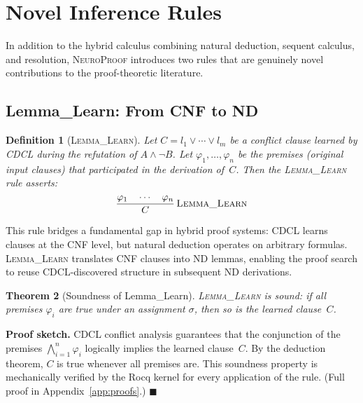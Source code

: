 \documentclass[conference]{IEEEtran}
\newtheorem{theorem}{Theorem}[section]
\newtheorem{definition}[theorem]{Definition}
\newenvironment{proof}[1][Proof]{\textbf{#1.} }{\hfill$\blacksquare$}
\newcommand{\NP}{\textsc{NeuroProof}}
\newcommand{\infrule}[3]{
  \dfrac{\displaystyle #2}{\displaystyle #3}\,\textsc{#1}
}
\begin{document}
\section{Novel Inference Rules}
\label{sec:novel-rules}

In addition to the hybrid calculus combining natural deduction,
sequent calculus, and resolution, \NP{} introduces two rules that
are genuinely novel contributions to the proof-theoretic literature.

\subsection{Lemma\_Learn: From CNF to ND}

\begin{definition}[\textsc{Lemma\_Learn}]
  \label{def:lemma-learn}
  Let $C = l_1 \lor \cdots \lor l_m$ be a conflict clause learned by
  CDCL during the refutation of $A \land \neg B$.  Let $\varphi_1,
  \dots, \varphi_n$ be the premises (original input clauses) that
  participated in the derivation of~$C$.  Then the
  \textsc{Lemma\_Learn} rule asserts:
  \begin{equation}
    \infrule{\textsc{Lemma\_Learn}}
          {\varphi_1 \quad \cdots \quad \varphi_n}
          {C}
  \end{equation}
\end{definition}

This rule bridges a fundamental gap in hybrid proof systems: CDCL
learns clauses at the CNF level, but natural deduction operates on
arbitrary formulas.  \textsc{Lemma\_Learn} translates CNF clauses
into ND lemmas, enabling the proof search to reuse CDCL-discovered
structure in subsequent ND derivations.

\begin{theorem}[Soundness of Lemma\_Learn]
  \textsc{Lemma\_Learn} is sound: if all premises $\varphi_i$ are
  true under an assignment $\sigma$, then so is the learned
  clause~$C$.
\end{theorem}
\begin{proof}[Proof sketch]
  CDCL conflict analysis guarantees that the conjunction of the
  premises $\bigwedge_{i=1}^{n} \varphi_i$ logically implies the
  learned clause~$C$.  By the deduction theorem, $C$ is true whenever
  all premises are.  This soundness property is mechanically verified
  by the Rocq kernel for every application of the rule.
  (Full proof in Appendix~\ref{app:proofs}.)
\end{proof}
\end{document}
